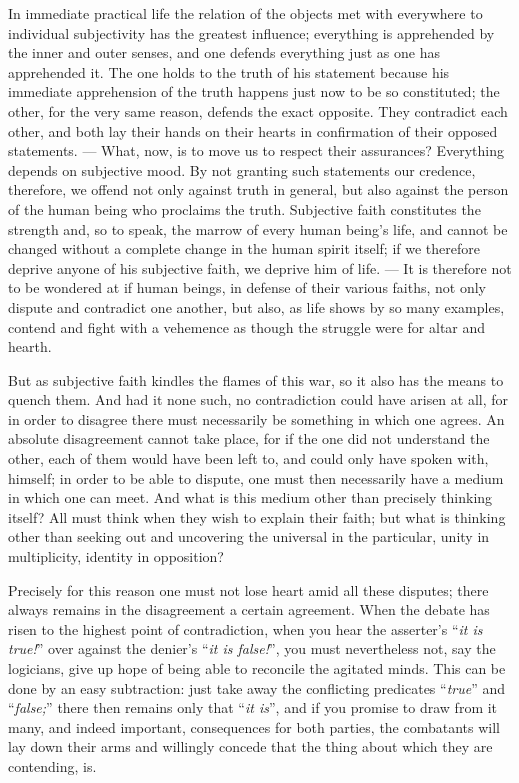 \documentclass[12pt]{book}
\newcommand{\opage}[1]{\marginnote{\footnotesize\textit{[#1]}}}
\begin{document}
In immediate practical life the relation of the objects met with everywhere to
individual subjectivity has the greatest
\opage{6} influence; everything is apprehended by the inner and outer senses,
and one defends everything just as one has apprehended it. The one holds to the
truth of his statement because his immediate apprehension of the truth happens
just now to be so constituted; the other, for the very same reason, defends
the exact opposite. They contradict each other, and both lay their hands on
their hearts in confirmation of their opposed statements. --- What, now, is to
move us to respect their assurances? Everything depends on subjective mood. By
not granting such statements our credence, therefore, we offend not only
against truth in general, but also against the person of the human being who
proclaims the truth. Subjective faith constitutes the strength and, so to
speak, the marrow of every human being's life, and cannot be changed without a
complete change in the human spirit itself; if we therefore deprive anyone of
his subjective faith, we deprive him of life. --- It is therefore not to be
wondered at if human beings, in defense of their various faiths, not only
dispute and contradict one another, but also, as life shows by so many
examples, contend and fight with a vehemence as though the struggle were for
altar and hearth.

But as subjective faith kindles the flames of this war, so it also has the
means to quench them. And had it none such, no contradiction could have arisen
at all, for in order to disagree there must necessarily be something in which
one agrees. An absolute disagreement cannot take place, for if the one did not
understand the other, each of them would have been left to, and could only have
spoken with, himself; in order to be able to dispute, one must then necessarily
have a medium in which one can meet. And what is this medium other than
precisely thinking itself? All must think when they wish to explain their
faith; but what is
\opage{7} thinking other than seeking out and uncovering the universal in the
particular, unity in multiplicity, identity in opposition?

Precisely for this reason one must not lose heart amid all these disputes;
there always remains in the disagreement a certain agreement. When the debate
has risen to the highest point of contradiction, when you hear the asserter's
``\emph{it is true!}'' over against the denier's ``\emph{it is false!}'', you
must nevertheless not, say the logicians, give up hope of being able to
reconcile the agitated minds. This can be done by an easy subtraction: just
take away the conflicting predicates ``\emph{true}'' and ``\emph{false;}'' there
then remains only that ``\emph{it is}'', and if you promise to draw from it
many, and indeed important, consequences for both parties, the combatants will
lay down their arms and willingly concede that the thing about which they are
contending, is.
\end{document}
